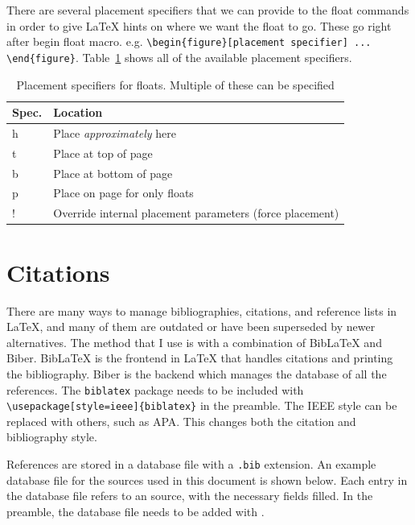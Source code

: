 \documentclass[11pt, twoside]{article}
\begin{document}
There are several placement specifiers that we can provide to the float commands in order to give \LaTeX{} hints on where we want the float to go. These go right after begin float macro. e.g. \lstinline|\begin{figure}[placement specifier] ... \end{figure}|. Table~\ref{tab:placement-specs} shows all of the available placement specifiers.

\begin{table}
    \centering
    \caption{Placement specifiers for floats. Multiple of these can be specified}
    \label{tab:placement-specs}
    \begin{tabular}{ll}
        \toprule
        Spec. & Location                                                 \\
        \midrule
        h     & Place \emph{approximately} here                          \\
        t     & Place at top of page                                     \\
        b     & Place at bottom of page                                  \\
        p     & Place on page for only floats                            \\
        !     & Override internal placement parameters (force placement) \\
        \bottomrule
    \end{tabular}
\end{table}

\section{Citations}
There are many ways to manage bibliographies, citations, and reference lists in \LaTeX{}, and many of them are outdated or have been superseded by newer alternatives. The method that I use is with a combination of BibLaTeX and Biber. BibLaTeX is the frontend in \LaTeX{} that handles citations and printing the bibliography. Biber is the backend which manages the database of all the references. The \lstinline{biblatex} package needs to be included with \lstinline|\usepackage[style=ieee]{biblatex}| in the preamble. The IEEE style can be replaced with others, such as APA. This changes both the citation and bibliography style.

References are stored in a database file with a \lstinline{.bib} extension. An example database file for the sources used in this document is shown below. Each entry in the database file refers to an source, with the necessary fields filled. In the preamble, the database file needs to be added with \lstinline||.
\end{document}
